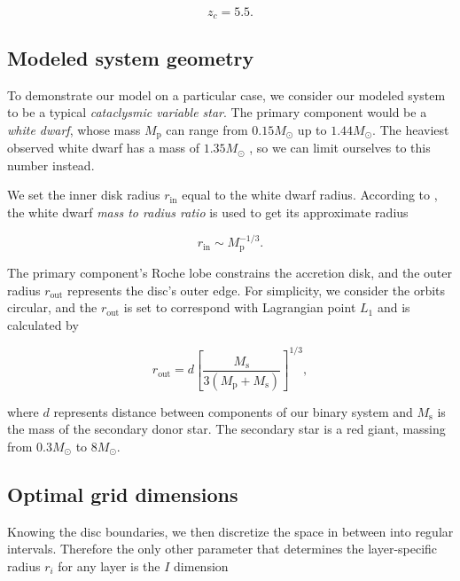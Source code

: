 \begin{equation}
	z_c = 5.5.
	\label{eq:z_critical_model}
\end{equation}

\subsection{Modeled system geometry}

To demonstrate our model on a particular case, we consider our modeled system to be a typical \emph{cataclysmic variable star}. The primary component would be a \emph{white dwarf}, whose mass $M_{\text{p}}$ can range from $0.15 M_{\odot}$ up to $1.44 M_{\odot}$. The heaviest observed white dwarf has a mass of $1.35 M_{\odot}$ \cite{caiazzo2021}, so we can limit ourselves to this number instead.

We set the inner disk radius $r_{\text{in}}$ equal to the white dwarf radius. According to \cite{shapiro1983}, the white dwarf \emph{mass to radius ratio} is used to get its approximate radius

\begin{equation}
    r_{\text{in}} \sim M_{\text{p}}^{-1/3}.
\end{equation}

The primary component's Roche lobe constrains the accretion disk, and the outer radius $r_{\text{out}}$ represents the disc's outer edge. For simplicity, we consider the orbits circular, and the $r_{\text{out}}$ is set to correspond with Lagrangian point $L_1$ and is calculated by

\begin{equation}
    r_{\text{out}} = d \left[ \frac{M_{\text{s}}}{3 (M_{\text{p}}+M_{\text{s}})} \right]^{1/3},
\end{equation}

where $d$ represents distance between components of our binary system and $M_{\text{s}}$ is the mass of the secondary donor star. The secondary star is a red giant, massing from $0.3M_{\odot}$ to $8M_{\odot}$. 

\subsection{Optimal grid dimensions}

Knowing the disc boundaries, we then discretize the space in between into regular intervals. Therefore the only other parameter that determines the layer-specific radius $r_i$ for any layer is the $I$ dimension

